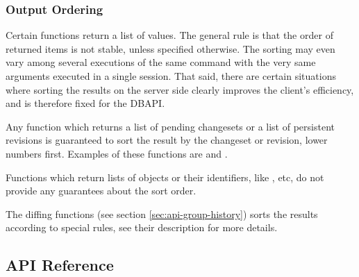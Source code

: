 \documentclass{article}
\begin{document}
\subsubsection{Output Ordering}

Certain functions return a list of values.  The general rule is that the order of returned items is not stable, unless
specified otherwise.  The sorting may even vary among several executions of the same command with the very same
arguments executed in a single session.  That said, there are certain situations where sorting the results on the server
side clearly improves the client's efficiency, and is therefore fixed for the DBAPI.

Any function which returns a list of pending changesets or a list of persistent revisions is guaranteed to sort the
result by the changeset or revision, lower numbers first.  Examples of these functions are 
and .

Functions which return lists of objects or their identifiers, like ,
 etc, do not provide any guarantees about the sort order.

The diffing functions (see section \ref{sec:api-group-history}) sorts the results according to special rules, see their
description for more details.

\subsection{API Reference}

\newcommand{\deskaFunc}[5]
{\paragraph{#1}\label{sec:api-ref-#1}

{#4}

{#5}

\subparagraph{Sample JSON input} {\tt \{"command": "{#1}", "tag": "T"{#2}\}}

\subparagraph{Sample JSON output} {\tt \{"response": "{#1}", "tag": "T"\ifstrequal{#3}{}{}{, "{#1}": {#3}}\}}

}

\newcommand{\deskaUnsortedRes}{The order of the returned data is not specified.}

\setcounter{secnumdepth}{4}
\end{document}
